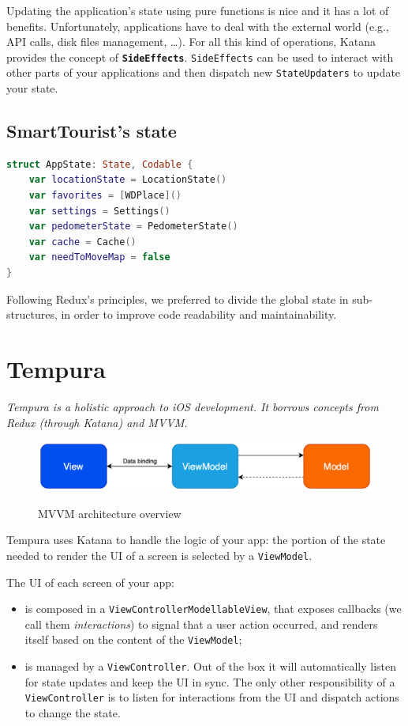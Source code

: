 \documentclass[a4paper, 11pt, parskip=half]{scrreprt}
\theoremstyle{definition}
\newenvironment{linedquote}{
	\begin{mdframed}[style=linedquote]
}{
	\end{mdframed}
}
\begin{document}
Updating the application's state using pure functions is nice and it has a lot of benefits. Unfortunately, applications have to deal with the external world (e.g., API calls, disk files management, …). For all this kind of operations, Katana provides the concept of \textbf{\texttt{SideEffects}}. \texttt{SideEffects} can be used to interact with other parts of your applications and then dispatch new \texttt{StateUpdaters} to update your state.

\subsection{SmartTourist's state}
		
\begin{lstlisting}[language=swift]
struct AppState: State, Codable {
	var locationState = LocationState()
	var favorites = [WDPlace]()
	var settings = Settings()
	var pedometerState = PedometerState()
	var cache = Cache()
	var needToMoveMap = false
}
\end{lstlisting}

Following Redux's principles, we preferred to divide the global state in sub-structures, in order to improve code readability and maintainability.

\newpage
\section{Tempura}

\begin{linedquote}
    \textit{Tempura is a holistic approach to iOS development. It borrows concepts from Redux (through Katana) and MVVM.}
\end{linedquote}

\begin{figure}[H]
  	\centering
  	\includegraphics[width=0.85\linewidth]{MVVM-light}
  	\label{fig:test1}
	\caption{MVVM architecture overview}
\end{figure}

Tempura uses Katana to handle the logic of your app: the portion of the state needed to render the UI of a screen is selected by a \texttt{ViewModel}.

The UI of each screen of your app:
\begin{itemize}
	\item is composed in a \texttt{ViewControllerModellableView}, that exposes callbacks (we call them \textit{interactions}) to signal that a user action occurred, and renders itself based on the content of the \texttt{ViewModel};
	\item is managed by a \texttt{ViewController}. Out of the box it will automatically listen for state updates and keep the UI in sync. The only other responsibility of a \texttt{ViewController} is to listen for interactions from the UI and dispatch actions to change the state.
\end{itemize}
\end{document}
